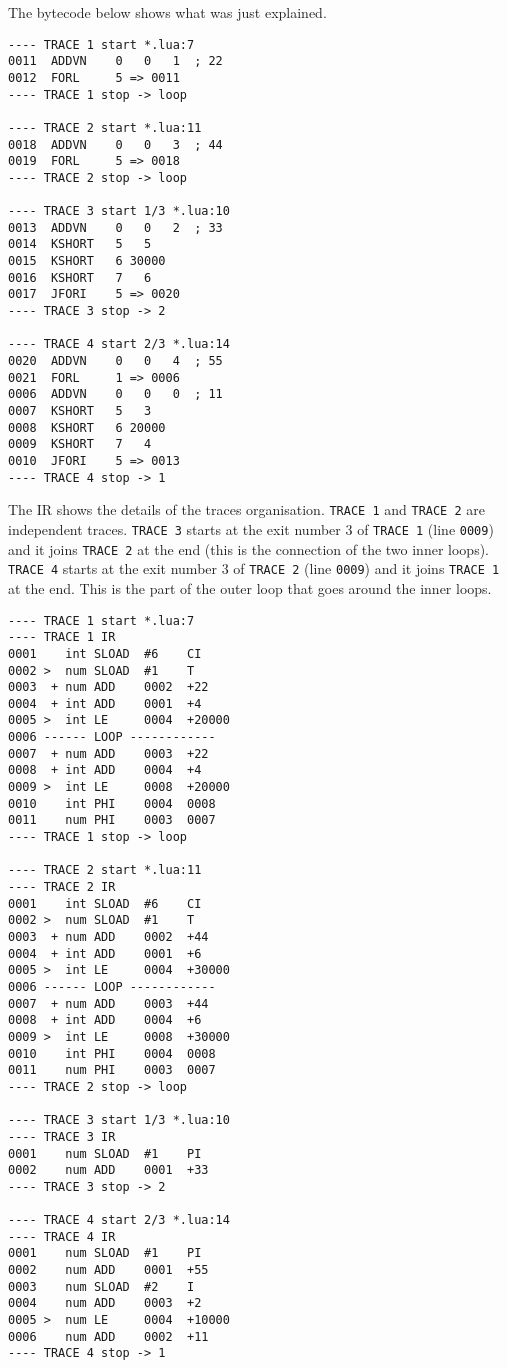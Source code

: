 The bytecode below shows what was just explained.

\begin{multicols}{2}
\begin{lstlisting}[style=DumpStyle]
---- TRACE 1 start *.lua:7
0011  ADDVN    0   0   1  ; 22
0012  FORL     5 => 0011
---- TRACE 1 stop -> loop

---- TRACE 2 start *.lua:11
0018  ADDVN    0   0   3  ; 44
0019  FORL     5 => 0018
---- TRACE 2 stop -> loop

---- TRACE 3 start 1/3 *.lua:10
0013  ADDVN    0   0   2  ; 33
0014  KSHORT   5   5
0015  KSHORT   6 30000
0016  KSHORT   7   6
0017  JFORI    5 => 0020
---- TRACE 3 stop -> 2

---- TRACE 4 start 2/3 *.lua:14
0020  ADDVN    0   0   4  ; 55
0021  FORL     1 => 0006
0006  ADDVN    0   0   0  ; 11
0007  KSHORT   5   3
0008  KSHORT   6 20000
0009  KSHORT   7   4
0010  JFORI    5 => 0013
---- TRACE 4 stop -> 1
\end{lstlisting}
\end{multicols}

\noindent
The IR shows the details of the traces organisation. \texttt{TRACE 1} and \texttt{TRACE 2} are independent traces. \texttt{TRACE 3} starts at the exit number 3 of \texttt{TRACE 1} (line \texttt{0009}) and it joins \texttt{TRACE 2} at the end (this is the connection of the two inner loops). \texttt{TRACE 4} starts at the exit number 3 of \texttt{TRACE 2} (line \texttt{0009}) and it joins \texttt{TRACE 1} at the end. This is the part of the outer loop that goes around the inner loops.

\begin{multicols}{2}
\begin{lstlisting}[style=DumpStyle]
---- TRACE 1 start *.lua:7
---- TRACE 1 IR
0001    int SLOAD  #6    CI
0002 >  num SLOAD  #1    T
0003  + num ADD    0002  +22 
0004  + int ADD    0001  +4  
0005 >  int LE     0004  +20000
0006 ------ LOOP ------------
0007  + num ADD    0003  +22 
0008  + int ADD    0004  +4  
0009 >  int LE     0008  +20000
0010    int PHI    0004  0008
0011    num PHI    0003  0007
---- TRACE 1 stop -> loop

---- TRACE 2 start *.lua:11
---- TRACE 2 IR
0001    int SLOAD  #6    CI
0002 >  num SLOAD  #1    T
0003  + num ADD    0002  +44 
0004  + int ADD    0001  +6  
0005 >  int LE     0004  +30000
0006 ------ LOOP ------------
0007  + num ADD    0003  +44 
0008  + int ADD    0004  +6  
0009 >  int LE     0008  +30000
0010    int PHI    0004  0008
0011    num PHI    0003  0007
---- TRACE 2 stop -> loop

---- TRACE 3 start 1/3 *.lua:10
---- TRACE 3 IR
0001    num SLOAD  #1    PI
0002    num ADD    0001  +33 
---- TRACE 3 stop -> 2

---- TRACE 4 start 2/3 *.lua:14
---- TRACE 4 IR
0001    num SLOAD  #1    PI
0002    num ADD    0001  +55 
0003    num SLOAD  #2    I
0004    num ADD    0003  +2  
0005 >  num LE     0004  +10000
0006    num ADD    0002  +11 
---- TRACE 4 stop -> 1
\end{lstlisting}
\end{multicols}

